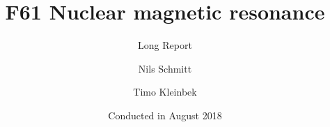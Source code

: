 \documentclass[12pt,
				 a4paper,
				numbers=endperiod
				 ]{scrartcl}
\title{F61 Nuclear magnetic resonance}
\subtitle{Long Report}
\author{Nils Schmitt \and Timo Kleinbek}
\date{Conducted in August 2018}
\begin{document}
\maketitle

\tableofcontents




\nocite{*}
\printbibliography
\end{document}
